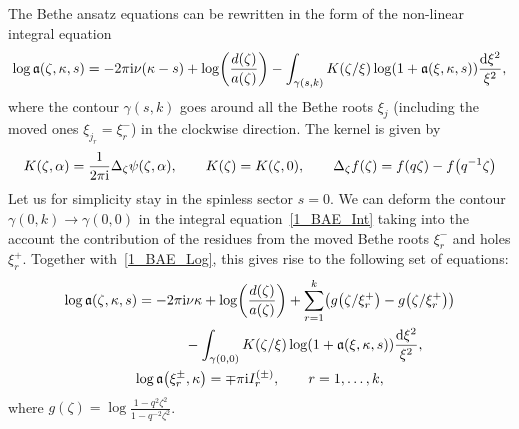 \documentclass[pdftex]{sigma}
\numberwithin{equation}{section}
\begin{document}
The Bethe ansatz equations can be rewritten in the form of the non-linear integral equation~\mbox{\cite{BLZ_2,DdV_1995_Int1,Kluemper_1992_Int2}}
\begin{align}\label{1_BAE_Int}
\log\mathfrak{a}(\zeta, \kappa, s)=-2\pi {\rm i} \nu(\kappa-s) + \log\biggl(\frac{d(\zeta)}{a(\zeta)}\biggr) -
 \int_{\gamma(s, k)} K(\zeta/\xi) \log(1+\mathfrak{a}(\xi, \kappa, s))\frac{{\rm d}\xi^2}{\xi^2},
\end{align}
where the contour $\gamma(s, k)$ goes around all the Bethe roots $\xi_j$ (including the moved ones $\xi_{j_r}=\xi^{-}_r$) in the clockwise direction. The kernel is given by
\begin{align}\label{1_Kernel_Delta}
K(\zeta, \alpha)=\frac{1}{2\pi {\rm i}} \Delta_\zeta \psi(\zeta, \alpha),
\qquad
K(\zeta)=K(\zeta, 0),
\qquad
\Delta_\zeta f(\zeta)=f(q\zeta)-f\bigl(q^{-1}\zeta\bigr)
\end{align}
Let us for simplicity stay in the spinless sector $s=0$. We can deform the contour ${\gamma(0, k)\!\rightarrow\!\gamma(0, 0)}$ in the integral equation~\eqref{1_BAE_Int} taking into the account  the contribution of the residues from the moved Bethe roots $\xi_r^-$ and holes $\xi_r^+$. Together with~\eqref{1_BAE_Log}, this gives rise to the following set of equations:
\begin{gather}
\log\mathfrak{a}(\zeta, \kappa, s)=-2\pi {\rm i} \nu\kappa + \log\biggl(\frac{d(\zeta)}{a(\zeta)}\biggr)
                                   +\sum_{r=1}^{k}\bigl( g\bigl(\zeta/\xi_r^+\bigr) - g\bigl(\zeta/\xi_r^+\bigr) \bigr)\nonumber\\
                                   \hphantom{\log\mathfrak{a}(\zeta, \kappa, s)=}{}
                                  -\int_{\gamma(0, 0)} K(\zeta/\xi) \log(1+\mathfrak{a}(\xi, \kappa, s))\frac{{\rm d}\xi^2}{\xi^2}, \nonumber\\
 \log\mathfrak{a}\bigl(\xi_r^{\pm}, \kappa\bigr)=\mp \pi {\rm i} I_r^{(\pm)}, \qquad r=1, \dots, k,\label{1_BAE_Int_Deform}
\end{gather}
where $g(\zeta)=\log\frac{1-q^2\zeta^2}{1-q^{-2}\zeta^2}$.
\end{document}
